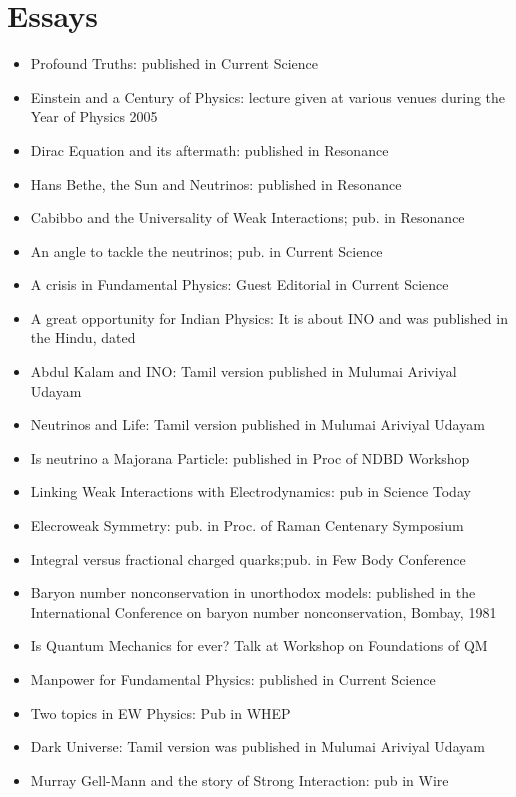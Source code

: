 \section{Essays}
\begin{itemize}
\item Profound Truths: published in Current Science
\item Einstein and a Century of Physics: lecture given at various venues during the Year of Physics 2005
\item Dirac Equation and its aftermath: published in Resonance
\item Hans Bethe, the Sun and Neutrinos: published in Resonance
\item Cabibbo and the Universality of Weak Interactions; pub. in Resonance
\item An angle to tackle the neutrinos; pub. in Current Science
\item A crisis in Fundamental Physics: Guest Editorial in Current Science
\item A great opportunity for Indian Physics: It is about INO and was published in the Hindu, dated
\item Abdul Kalam and INO: Tamil version published in Mulumai Ariviyal Udayam
\item Neutrinos and Life: Tamil version published in Mulumai Ariviyal Udayam
\item Is neutrino a Majorana Particle: published in Proc of NDBD Workshop
\item Linking Weak Interactions with Electrodynamics: pub in Science Today
\item Elecroweak Symmetry: pub. in Proc. of Raman Centenary Symposium
\item Integral versus fractional charged quarks;pub. in Few Body Conference
\item Baryon number nonconservation in unorthodox models: published in the International Conference on baryon number nonconservation, Bombay, 1981
\item Is Quantum Mechanics for ever? Talk at Workshop on Foundations of QM
\item Manpower for Fundamental Physics: published in Current Science
\item Two topics in EW Physics: Pub in WHEP
\item Dark Universe: Tamil version was published in Mulumai Ariviyal Udayam
\item Murray Gell-Mann and the story of Strong Interaction: pub in Wire
\end{itemize}

